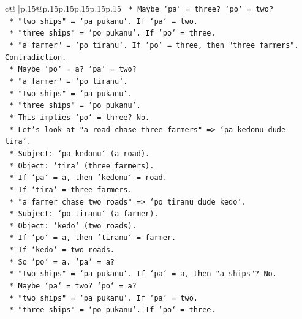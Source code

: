 \documentclass{article}
\begin{document}
{\begin{supertabular}{c@{$\;$}|p{.15\linewidth}@{}p{.15\linewidth}p{.15\linewidth}p{.15\linewidth}p{.15\linewidth}p{.15\linewidth}}
{{{\texttt{                *   Maybe `pa` = three? `po` = two?} \\
\texttt{                *   "two ships" = `pa pukanu`. If `pa` = two.} \\
\texttt{                *   "three ships" = `po pukanu`. If `po` = three.} \\
\texttt{                *   "a farmer" = `po tiranu`. If `po` = three, then "three farmers". Contradiction.} \\
\texttt{                *   Maybe `po` = a? `pa` = two?} \\
\texttt{                *   "a farmer" = `po tiranu`.} \\
\texttt{                *   "two ships" = `pa pukanu`.} \\
\texttt{                *   "three ships" = `po pukanu`.} \\
\texttt{                *   This implies `po` = three? No.} \\
\texttt{                *   Let's look at "a road chase three farmers" => `pa kedonu dude tira`.} \\
\texttt{                *   Subject: `pa kedonu` (a road).} \\
\texttt{                *   Object: `tira` (three farmers).} \\
\texttt{                *   If `pa` = a, then `kedonu` = road.} \\
\texttt{                *   If `tira` = three farmers.} \\
\texttt{                *   "a farmer chase two roads" => `po tiranu dude kedo`.} \\
\texttt{                *   Subject: `po tiranu` (a farmer).} \\
\texttt{                *   Object: `kedo` (two roads).} \\
\texttt{                *   If `po` = a, then `tiranu` = farmer.} \\
\texttt{                *   If `kedo` = two roads.} \\
\texttt{                *   So `po` = a. `pa` = a?} \\
\texttt{                *   "two ships" = `pa pukanu`. If `pa` = a, then "a ships"? No.} \\
\texttt{                *   Maybe `pa` = two? `po` = a?} \\
\texttt{                *   "two ships" = `pa pukanu`. If `pa` = two.} \\
\texttt{                *   "three ships" = `po pukanu`. If `po` = three.} \\
}}}
\end{supertabular}}
\end{document}
